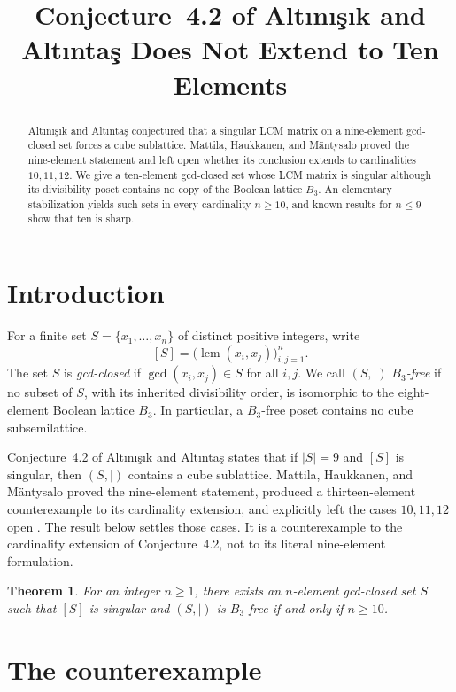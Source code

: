 \documentclass[11pt]{amsart}
\title[Conjecture 4.2 does not extend to ten elements]
{Conjecture~4.2 of Alt\i n\i\c{s}\i k and Alt\i nta\c{s}
Does Not Extend to Ten Elements}
\date{}
\newtheorem{theorem}{Theorem}
\begin{document}
\begin{abstract}
Alt\i n\i\c{s}\i k and Alt\i nta\c{s} conjectured that a singular
LCM matrix on a nine-element gcd-closed set forces a cube sublattice.
Mattila, Haukkanen, and M\"antysalo proved the nine-element statement
and left open whether its conclusion extends to cardinalities
$10,11,12$. We give a ten-element gcd-closed set whose LCM matrix is
singular although its divisibility poset contains no copy of the
Boolean lattice $B_3$. An elementary stabilization yields such sets
in every cardinality $n\ge 10$, and known results for $n\le 9$ show
that ten is sharp.
\end{abstract}

\maketitle

\section{Introduction}

For a finite set $S=\{x_1,\dots,x_n\}$ of distinct positive integers,
write
\[
 [S]=\bigl(\operatorname{lcm}(x_i,x_j)\bigr)_{i,j=1}^n.
\]
The set $S$ is \emph{gcd-closed} if
$\gcd(x_i,x_j)\in S$ for all $i,j$. We call $(S,\mid)$
\emph{$B_3$-free} if no subset of $S$, with its inherited divisibility
order, is isomorphic to the eight-element Boolean lattice $B_3$.
In particular, a $B_3$-free poset contains no cube subsemilattice.

Conjecture~4.2 of Alt\i n\i\c{s}\i k and Alt\i nta\c{s}
\cite{AltinisikAltintas2017} states that if $|S|=9$ and $[S]$ is
singular, then $(S,\mid)$ contains a cube sublattice. Mattila,
Haukkanen, and M\"antysalo proved the nine-element statement, produced
a thirteen-element counterexample to its cardinality extension, and
explicitly left the cases $10,11,12$ open
\cite{MattilaHaukkanenMantysalo2024}. The result below settles those
cases. It is a counterexample to the cardinality extension of
Conjecture~4.2, not to its literal nine-element formulation.

\begin{theorem}\label{thm:main}
For an integer $n\ge 1$, there exists an $n$-element gcd-closed set
$S$ such that $[S]$ is singular and $(S,\mid)$ is $B_3$-free if and
only if $n\ge 10$.
\end{theorem}

\section{The counterexample}
\end{document}
